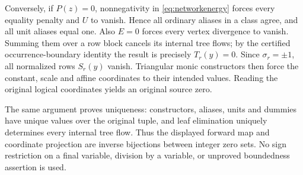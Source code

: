 Conversely, if $P(z)=0$, nonnegativity in \eqref{eq:networkenergy} forces every equality
penalty and $U$ to vanish. Hence all ordinary aliases in a class agree,
and all unit aliases equal one. Also $E=0$ forces every vertex divergence
to vanish. Summing them over a row block cancels its internal tree flows;
by the certified occurrence-boundary identity the result is precisely
$T_r(y)=0$. Since $\sigma_r=\pm1$, all normalized rows $S_r(y)$ vanish.
Triangular monic constructors then force the constant, scale and affine
coordinates to their intended values. Reading the original logical
coordinates yields an original source zero.

The same argument proves uniqueness: constructors, aliases, units and
dummies have unique values over the original tuple, and leaf elimination
uniquely determines every internal tree flow. Thus the displayed forward
map and coordinate projection are inverse bijections between integer zero
sets. No sign restriction on a final variable, division by a variable,
or unproved boundedness assertion is used.


